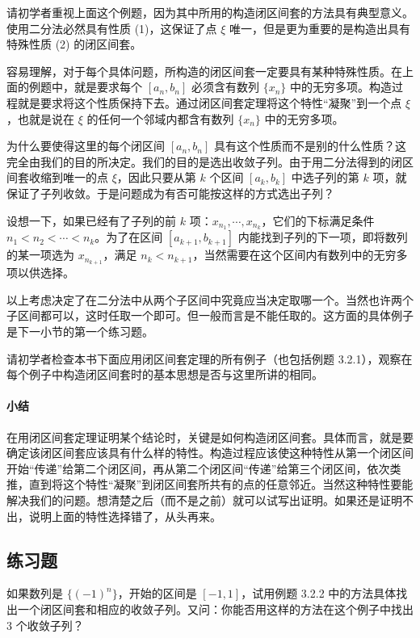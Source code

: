 \begin{xremark}
请初学者重视上面这个例题，因为其中所用的构造闭区间套的方法具有典型意义。使用二分法必然具有性质 (1)，这保证了点 $\xi$ 唯一，但是更为重要的是构造出具有特殊性质 (2) 的闭区间套。
\end{xremark}

容易理解，对于每个具体问题，所构造的闭区间套一定要具有某种特殊性质。在上面的例题中，就是要求每个 $[a_n,b_n]$ 必须含有数列 $\{x_n\}$ 中的无穷多项。构造过程就是要求将这个性质保持下去。通过闭区间套定理将这个特性“凝聚”到一个点 $\xi$，也就是说在 $\xi$ 的任何一个邻域内都含有数列 $\{x_n\}$ 中的无穷多项。

为什么要使得这里的每个闭区间 $[a_n,b_n]$ 具有这个性质而不是别的什么性质？这完全由我们的目的所决定。我们的目的是选出收敛子列。由于用二分法得到的闭区间套收缩到唯一的点 $\xi$，因此只要从第 $k$ 个区间 $[a_k,b_k]$ 中选子列的第 $k$ 项，就保证了子列收敛。于是问题成为有否可能按这样的方式选出子列？

设想一下，如果已经有了子列的前 $k$ 项：$x_{n_1},\cdots,x_{n_k}$，它们的下标满足条件 $n_1<n_2<\cdots<n_k$。为了在区间 $[a_{k+1},b_{k+1}]$ 内能找到子列的下一项，即将数列的某一项选为 $x_{n_{k+1}}$，满足 $n_k<n_{k+1}$，当然需要在这个区间内有数列中的无穷多项以供选择。

以上考虑决定了在二分法中从两个子区间中究竟应当决定取哪一个。当然也许两个子区间都可以，这时任取一个即可。但一般而言是不能任取的。这方面的具体例子是下一小节的第一个练习题。

请初学者检查本书下面应用闭区间套定理的所有例子（也包括例题 3.2.1），观察在每个例子中构造闭区间套时的基本思想是否与这里所讲的相同。

\paragraph{小结}
在用闭区间套定理证明某个结论时，关键是如何构造闭区间套。具体而言，就是要确定该闭区间套应该具有什么样的特性。构造过程应该使这种特性从第一个闭区间开始“传递”给第二个闭区间，再从第二个闭区间“传递”给第三个闭区间，依次类推，直到将这个特性“凝聚”到闭区间套所共有的点的任意邻近。当然这种特性要能解决我们的问题。想清楚之后（而不是之前）就可以试写出证明。如果还是证明不出，说明上面的特性选择错了，从头再来。

\subsection{练习题}

\begin{xexercise}[1]
如果数列是 $\{(-1)^n\}$，开始的区间是 $[-1,1]$，试用例题 3.2.2 中的方法具体找出一个闭区间套和相应的收敛子列。又问：你能否用这样的方法在这个例子中找出 3 个收敛子列？
\end{xexercise}

